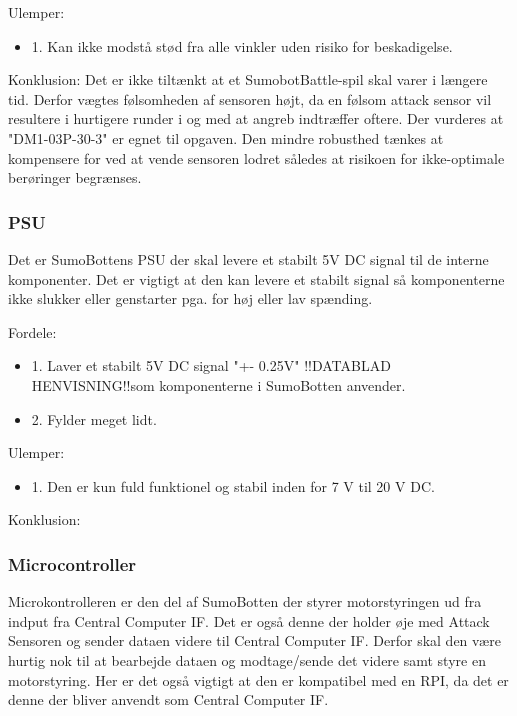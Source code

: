 Ulemper: 
\begin{itemize}
\item 1. Kan ikke modstå stød fra alle vinkler uden risiko for beskadigelse.
\end{itemize}

Konklusion:
Det er ikke tiltænkt at et SumobotBattle-spil skal varer i længere tid. Derfor vægtes følsomheden af sensoren højt, da en følsom attack sensor vil resultere i hurtigere runder i og med at angreb indtræffer oftere. Der vurderes at "DM1-03P-30-3" er egnet til opgaven. Den mindre robusthed tænkes at kompensere for ved at vende sensoren lodret således at risikoen for ikke-optimale berøringer begrænses.

\subsubsection*{\textbf{PSU}}
Det er SumoBottens PSU der skal levere et stabilt 5V DC signal til de interne komponenter. Det er vigtigt at den kan levere et stabilt signal så komponenterne ikke slukker eller genstarter pga. for høj eller lav spænding.  

Fordele: 
\begin{itemize}
\item 1. Laver et stabilt 5V DC signal "+- 0.25V" !!DATABLAD HENVISNING!!\tbr som komponenterne i SumoBotten anvender.
\item 2. Fylder meget lidt. 
\end{itemize}

Ulemper: 
\begin{itemize}
\item 1. Den er kun fuld funktionel og stabil inden for 7 V til 20 V DC.
\end{itemize}

Konklusion:

\subsubsection*{\textbf{Microcontroller}}
Microkontrolleren er den del af SumoBotten der styrer motorstyringen ud fra indput fra Central Computer IF. Det er også denne der holder øje med Attack Sensoren og sender dataen videre til Central Computer IF. Derfor skal den være hurtig nok til at bearbejde dataen og modtage/sende det videre samt styre en motorstyring. Her er det også vigtigt at den er kompatibel med en RPI, da det er denne der bliver anvendt som Central Computer IF. 

